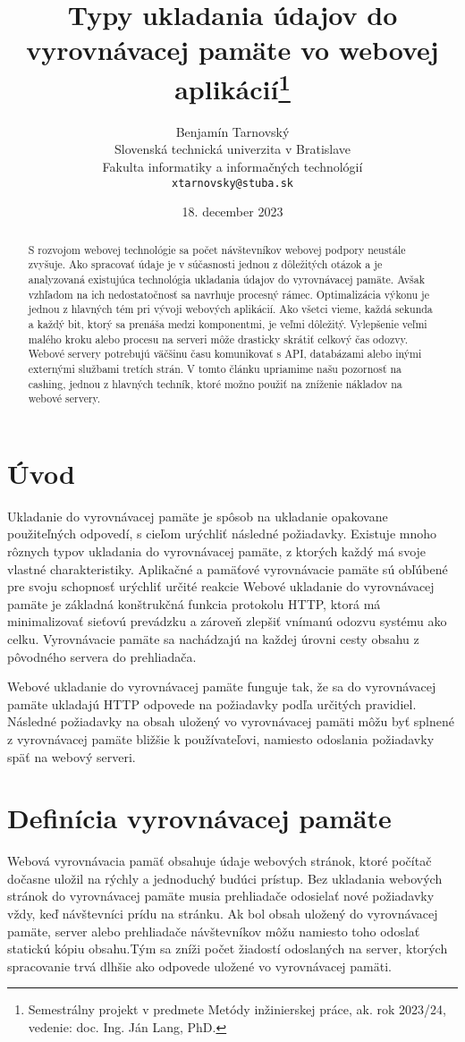 \documentclass[10pt,oneside,slovak,a4paper]{article}
\title{Typy ukladania údajov do vyrovnávacej pamäte vo webovej aplikácií\thanks{Semestrálny projekt v predmete Metódy inžinierskej práce, ak. rok 2023/24, vedenie: doc. Ing. Ján Lang, PhD.}}
\author{Benjamín Tarnovský\\[2pt]
	{\small Slovenská technická univerzita v Bratislave}\\
	{\small Fakulta informatiky a informačných technológií}\\
	{\small \texttt{xtarnovsky@stuba.sk}}
	}
\date{\small 18. december 2023}
\begin{document}
\maketitle

\begin{abstract}

S rozvojom webovej technológie sa počet návštevníkov webovej podpory neustále zvyšuje.
Ako spracovať  údaje je v súčasnosti jednou z dôležitých otázok a je analyzovaná existujúca technológia ukladania údajov do vyrovnávacej pamäte.
Avšak vzhľadom na ich nedostatočnosť sa navrhuje procesný rámec. Optimalizácia výkonu je jednou z hlavných tém pri vývoji webových aplikácií.
Ako všetci vieme, každá sekunda a každý bit, ktorý sa prenáša medzi komponentmi, je veľmi dôležitý.
Vylepšenie veľmi malého kroku alebo procesu na serveri môže drasticky skrátiť celkový čas odozvy.
Webové servery potrebujú väčšinu času komunikovať s API, databázami alebo inými externými službami tretích strán.
V tomto článku upriamime našu pozornosť na cashing, jednou z hlavných techník, ktoré možno použiť na zníženie nákladov na webové servery.

\end{abstract}

\section{Úvod} 
\quad Ukladanie do vyrovnávacej pamäte je spôsob na ukladanie opakovane použiteľných odpovedí, s cieľom urýchliť následné požiadavky. Existuje mnoho rôznych typov ukladania do vyrovnávacej pamäte, z ktorých každý má svoje vlastné charakteristiky. Aplikačné a pamäťové vyrovnávacie pamäte sú obľúbené pre svoju schopnosť urýchliť určité reakcie  Webové ukladanie do vyrovnávacej pamäte je základná konštrukčná funkcia protokolu HTTP\cite{OCEAN}, ktorá má minimalizovať sieťovú prevádzku a zároveň zlepšiť vnímanú odozvu systému ako celku. Vyrovnávacie pamäte sa nachádzajú na každej úrovni cesty obsahu z pôvodného servera do prehliadača.

Webové ukladanie do vyrovnávacej pamäte funguje tak, že sa do vyrovnávacej pamäte ukladajú HTTP \cite{OCEAN}odpovede na požiadavky podľa určitých pravidiel. Následné požiadavky na obsah uložený vo vyrovnávacej pamäti môžu byť splnené z vyrovnávacej pamäte bližšie k používateľovi, namiesto odoslania požiadavky späť na webový serveri. 

\section{Definícia vyrovnávacej pamäte} \label{Vysvetlenie}
\quad Webová vyrovnávacia pamäť obsahuje údaje webových stránok, ktoré počítač dočasne uložil na rýchly a jednoduchý budúci prístup.\cite{CHECK} Bez ukladania webových stránok do vyrovnávacej pamäte musia prehliadače odosielať nové požiadavky vždy, keď návštevníci prídu na  stránku. Ak bol  obsah uložený do vyrovnávacej pamäte,  server alebo prehliadače návštevníkov môžu namiesto toho odoslať statickú kópiu  obsahu.Tým sa zníži počet žiadostí odoslaných na  server, ktorých spracovanie trvá dlhšie ako odpovede uložené vo vyrovnávacej pamäti. 
\end{document}
